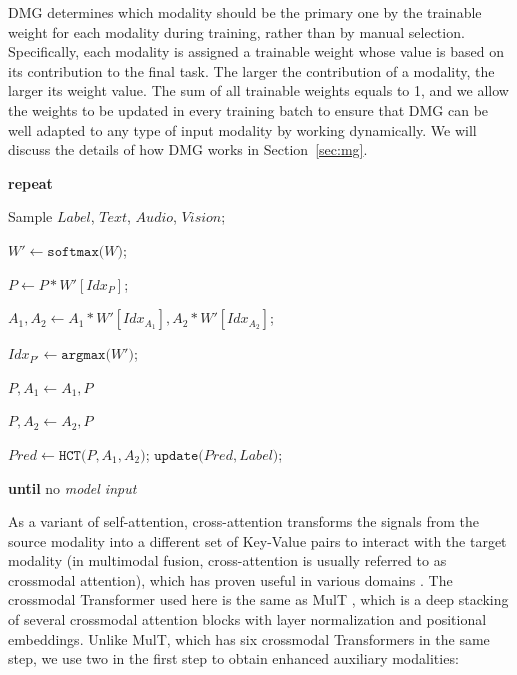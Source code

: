 \documentclass[11pt,a4paper]{article}
\begin{document}
DMG determines which modality should be the primary one by the trainable weight for each modality during training, rather than by manual selection. Specifically, each modality is assigned a trainable weight whose value is based on its contribution to the final task. The larger the contribution of a modality, the larger its weight value. The sum of all trainable weights equals to 1, and we allow the weights to be updated in every training batch to ensure that DMG can be well adapted to any type of input modality by working dynamically. We will discuss the details of how DMG works in Section~\ref{sec:mg}.

\begin{algorithm}[!ht]
    \small

   
    \textbf{repeat} \\
    {
        
        Sample $Label$, $Text$, $Audio$, $Vision$;
        
        $W' \leftarrow \texttt{softmax(}W\texttt{)}$;

        $P \leftarrow P * W'[Idx_P]$;
        
        $A_1, A_2 \leftarrow A_1 * W'[Idx_{A_1}], A_2 * W'[Idx_{A_2}]$;
        

        $Idx_{P'} \leftarrow \texttt{argmax(}W'\texttt{)}$;

        {
            $P, A_1 \leftarrow A_1, P$
        }
        
        {
            $P, A_2 \leftarrow A_2, P$
        }
        
        $Pred \leftarrow \texttt{HCT(}P, A_1, A_2\texttt{)}$;
        $\texttt{update(}Pred, Label\texttt{)}$;
    }
    \textbf{until} no \textit{model input}
    \caption{Working principle of HCT-DMG.}
    \label{alg-dmg}
\end{algorithm}

As a variant of self-attention, cross-attention \citep{lu2019vilbert} transforms the signals from the source modality into a different set of Key-Value pairs to interact with the target modality (in multimodal fusion, cross-attention is usually referred to as crossmodal attention), which has proven useful in various domains \citep{zhang2022cross,rashed2022context}. The crossmodal Transformer used here is the same as MulT \citep{Tsai2019}, which is a deep stacking of several crossmodal attention blocks with layer normalization and positional embeddings. Unlike MulT, which has six crossmodal Transformers in the same step, we use two in the first step to obtain enhanced auxiliary modalities:
\end{document}

